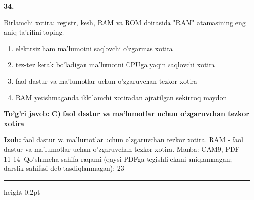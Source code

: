 \documentclass[10pt,a4paper]{article}
\begin{document}
{\bfseries\sffamily\color{ink} 34.}
\par
Birlamchi xotira: registr, kesh, RAM va ROM doirasida "RAM" atamasining eng aniq ta'rifini toping.
\begin{enumerate}[label=\Alph*),leftmargin=9mm]
\item elektrsiz ham ma'lumotni saqlovchi o'zgarmas xotira
\item tez-tez kerak bo'ladigan ma'lumotni CPUga yaqin saqlovchi xotira
\item faol dastur va ma'lumotlar uchun o'zgaruvchan tezkor xotira
\item RAM yetishmaganda ikkilamchi xotiradan ajratilgan sekinroq maydon
\end{enumerate}
\begin{tcolorbox}[enhanced,breakable,colback=teal!4,colframe=teal!60!black,boxrule=0.45pt,arc=1.2mm,left=2.7mm,right=2.7mm,top=1.8mm,bottom=1.8mm,before skip=2mm,after skip=2mm]
{\bfseries\sffamily\color{teal}To'g'ri javob:} \textbf{C) faol dastur va ma'lumotlar uchun o'zgaruvchan tezkor xotira}
\par\smallskip
{\bfseries Izoh:} faol dastur va ma'lumotlar uchun o'zgaruvchan tezkor xotira. RAM - faol dastur va ma'lumotlar uchun o'zgaruvchan tezkor xotira. Manba: CAM9, PDF 11-14; Qo'shimcha sahifa raqami (qaysi PDFga tegishli ekani aniqlanmagan; darslik sahifasi deb tasdiqlanmagan): 23
\end{tcolorbox}
\vspace{2mm}\hrule height 0.2pt\vspace{3mm}
\end{document}
